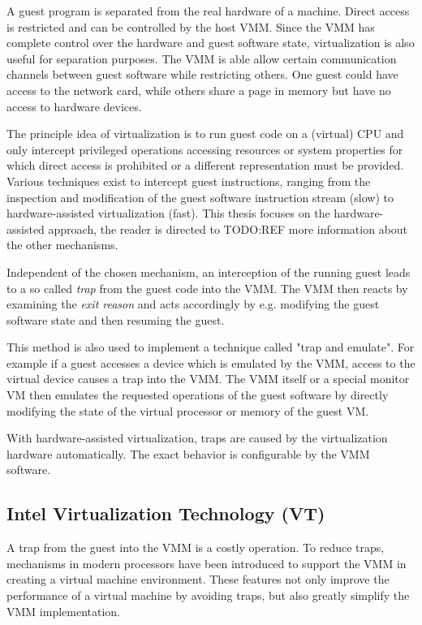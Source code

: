 A guest program is separated from the real hardware of a machine. Direct access
is restricted and can be controlled by the host VMM. Since the VMM has complete
control over the hardware and guest software state, virtualization is also
useful for separation purposes. The VMM is able allow certain communication
channels between guest software while restricting others. One guest could have
access to the network card, while others share a page in memory but have no
access to hardware devices.

The principle idea of virtualization is to run guest code on a (virtual) CPU and
only intercept privileged operations accessing resources or system properties
for which direct access is prohibited or a different representation must be
provided. Various techniques exist to intercept guest instructions, ranging from
the inspection and modification of the guest software instruction stream (slow)
to hardware-assisted virtualization (fast). This thesis focuses on the
hardware-assisted approach, the reader is directed to TODO:REF more information
about the other mechanisms.

Independent of the chosen mechanism, an interception of the running guest leads
to a so called \emph{trap} from the guest code into the VMM. The VMM
then reacts by examining the \emph{exit reason} and acts accordingly by e.g.
modifying the guest software state and then resuming the guest.

This method is also used to implement a technique called "trap and emulate". For
example if a guest accesses a device which is emulated by the VMM, access to the
virtual device causes a trap into the VMM. The VMM itself or a special monitor
VM then emulates the requested operations of the guest software by directly
modifying the state of the virtual processor or memory of the guest VM.

With hardware-assisted virtualization, traps are caused by the virtualization
hardware automatically. The exact behavior is configurable by the VMM software.

\subsection{Intel Virtualization Technology (VT)}
A trap from the guest into the VMM is a costly operation. To reduce traps,
mechanisms in modern processors have been introduced to support the VMM in
creating a virtual machine environment. These features not only improve the
performance of a virtual machine by avoiding traps, but also greatly simplify
the VMM implementation.

